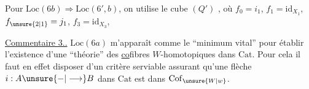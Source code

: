  Pour $\mathrm{Loc}(6b)\Longrightarrow\mathrm{Loc}(6',b)$, on utilise  le cube $(Q')$
, où $f_0=i_1$, $f_1=\mathrm{id}_{X_1}$, $f_{\unsure{2|1}}=j_1$, $f_3=\mathrm{id}_{X_3}$, 

\uline{Commentaire 3..} $\mathrm{Loc}(6a)$ m'apparaît comme le ``minimum vital'' pour établir l'existence d'une ``théorie'' des \uline{co}fibres $W$-homotopiques dans $\mathrm{Cat}$. Pour cela il faut en effet disposer d'un critère serviable assurant qu'une flèche $i:A\unsure{-|\longrightarrow}B$ dans $\mathrm{Cat}$ est dans $\mathrm{Cof}_{\unsure{W|w}}$.
